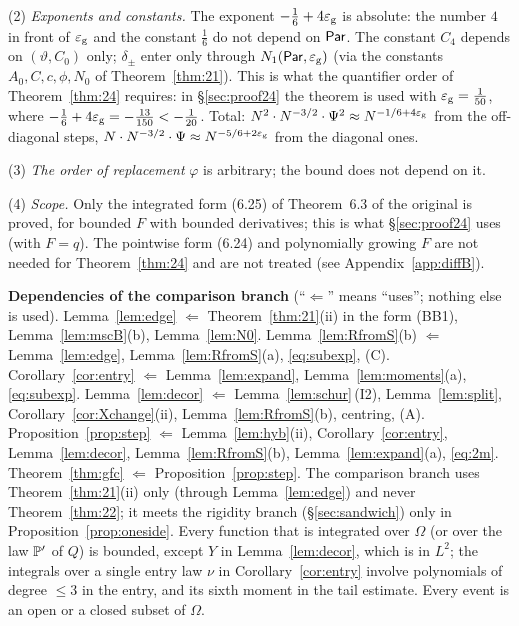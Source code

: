 (2) \emph{Exponents and constants.} The exponent $-\frac16+4\eg$ is absolute: the number $4$ in front of $\eg$ and the constant $\frac16$ do not depend on $\Par$. The constant $C_4$ depends on $(\vartheta,C_0)$ only;
$\delta_\pm$ enter only through $N_1(\Par,\eg)$ (via the constants $A_0,C,c,\phi,N_0$ of Theorem~\ref{thm:21}). This is what the quantifier order of Theorem~\ref{thm:24} requires: in \S\ref{sec:proof24} the theorem is used with
$\eg=\frac1{50}$, where $-\frac16+4\eg=-\frac{13}{150}<-\frac1{20}$. Total: $N^2\cdot N^{-3/2}\cdot\Psi^2\approx N^{-1/6+4\eg}$ from the off-diagonal steps, $N\cdot N^{-3/2}\cdot\Psi\approx N^{-5/6+2\eg}$ from the diagonal ones.

(3) \emph{The order of replacement} $\varphi$ is arbitrary; the bound does not depend on it.

(4) \emph{Scope.} Only the integrated form (6.25) of Theorem~6.3 of the original is proved, for bounded $F$ with bounded derivatives; this is what \S\ref{sec:proof24} uses (with $F=q$). The pointwise form (6.24)
and polynomially growing $F$ are not needed for Theorem~\ref{thm:24} and are not treated (see Appendix~\ref{app:diffB}).

\medskip\noindent\textbf{Dependencies of the comparison branch} (``$\Leftarrow$'' means ``uses''; nothing else is used).
Lemma~\ref{lem:edge} $\Leftarrow$ Theorem~\ref{thm:21}(ii) in the form \textup{(BB1)}, Lemma~\ref{lem:mscB}(b), Lemma~\ref{lem:N0}.
Lemma~\ref{lem:RfromS}(b) $\Leftarrow$ Lemma~\ref{lem:edge}, Lemma~\ref{lem:RfromS}(a), \eqref{eq:subexp}, (C).
Corollary~\ref{cor:entry} $\Leftarrow$ Lemma~\ref{lem:expand}, Lemma~\ref{lem:moments}(a), \eqref{eq:subexp}.
Lemma~\ref{lem:decor} $\Leftarrow$ Lemma~\ref{lem:schur}\,(I2), Lemma~\ref{lem:split}, Corollary~\ref{cor:Xchange}(ii), Lemma~\ref{lem:RfromS}(b), centring, (A).
Proposition~\ref{prop:step} $\Leftarrow$ Lemma~\ref{lem:hyb}(ii), Corollary~\ref{cor:entry}, Lemma~\ref{lem:decor}, Lemma~\ref{lem:RfromS}(b), Lemma~\ref{lem:expand}(a), \eqref{eq:2m}.
Theorem~\ref{thm:gfc} $\Leftarrow$ Proposition~\ref{prop:step}.
The comparison branch uses Theorem~\ref{thm:21}(ii) only (through Lemma~\ref{lem:edge}) and never Theorem~\ref{thm:22}; it meets the rigidity branch (\S\ref{sec:sandwich}) only in Proposition~\ref{prop:oneside}.
Every function that is integrated over $\Omega$ (or over the law $\P'$ of $Q$) is bounded, except $Y$ in Lemma~\ref{lem:decor}, which is in $L^2$; the integrals over a single entry law $\nu$
in Corollary~\ref{cor:entry} involve polynomials of degree $\le3$ in the entry, and its sixth moment in the tail estimate. Every event is an open or a closed subset of $\Omega$.
